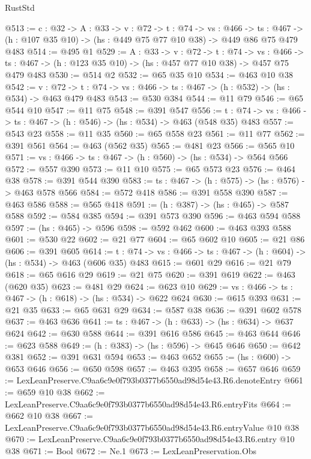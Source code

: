 \begin{lexlean}{RustStd}
\begin{coremodule}
@513 := {c : @32} ->
  {A : @33} ->
  {v : @72} ->
  {t : @74} ->
  {vs : @466} ->
  {ts : @467} -> (h : @107 @35 @10) -> (hs : @449 @75 @77 @10 @38) -> @449 @86 @75 @479 @483
@514 := @495 @1
@529 := {A : @33} ->
  {v : @72} ->
  {t : @74} ->
  {vs : @466} -> {ts : @467} -> (h : @123 @35 @10) -> (hs : @457 @77 @10 @38) -> @457 @75 @479 @483
@530 := @514 @2
@532 := @65 @35 @10
@534 := @463 @10 @38
@542 := {v : @72} ->
  {t : @74} -> {vs : @466} -> {ts : @467} -> (h : @532) -> (hs : @534) -> @463 @479 @483
@543 := @530 @384
@544 := @11 @79
@546 := @65 @544 @10
@547 := @11 @75
@548 := @391 @547
@556 := {t : @74} -> {vs : @466} -> {ts : @467} -> (h : @546) -> (hs : @534) -> @463 (@548 @35) @483
@557 := @543 @23
@558 := @11 @35
@560 := @65 @558 @23
@561 := @11 @77
@562 := @391 @561
@564 := @463 (@562 @35)
@565 := @481 @23
@566 := @565 @10
@571 := {vs : @466} -> {ts : @467} -> (h : @560) -> (hs : @534) -> @564 @566
@572 := @557 @390
@573 := @11 @10
@575 := @65 @573 @23
@576 := @464 @38
@578 := @391 @544 @390
@583 := {ts : @467} -> (h : @575) -> (hs : @576) -> @463 @578 @566
@584 := @572 @418
@586 := @391 @558 @390
@587 := @463 @586
@588 := @565 @418
@591 := (h : @387) -> (hs : @465) -> @587 @588
@592 := @584 @385
@594 := @391 @573 @390
@596 := @463 @594 @588
@597 := (hs : @465) -> @596
@598 := @592 @462
@600 := @463 @393 @588
@601 := @530 @22
@602 := @21 @77
@604 := @65 @602 @10
@605 := @21 @86
@606 := @391 @605
@614 := {t : @74} -> {vs : @466} -> {ts : @467} -> (h : @604) -> (hs : @534) -> @463 (@606 @35) @483
@615 := @601 @29
@616 := @21 @79
@618 := @65 @616 @29
@619 := @21 @75
@620 := @391 @619
@622 := @463 (@620 @35)
@623 := @481 @29
@624 := @623 @10
@629 := {vs : @466} -> {ts : @467} -> (h : @618) -> (hs : @534) -> @622 @624
@630 := @615 @393
@631 := @21 @35
@633 := @65 @631 @29
@634 := @587 @38
@636 := @391 @602 @578
@637 := @463 @636
@641 := {ts : @467} -> (h : @633) -> (hs : @634) -> @637 @624
@642 := @630 @588
@644 := @391 @616 @586
@645 := @463 @644
@646 := @623 @588
@649 := (h : @383) -> (hs : @596) -> @645 @646
@650 := @642 @381
@652 := @391 @631 @594
@653 := @463 @652
@655 := (hs : @600) -> @653 @646
@656 := @650 @598
@657 := @463 @395
@658 := @657 @646
@659 := LexLeanPreserve.C9aa6c9e0f793b0377b6550ad98d54e43.R6.denoteEntry
@661 := @659 @10 @38
@662 := LexLeanPreserve.C9aa6c9e0f793b0377b6550ad98d54e43.R6.entryFits
@664 := @662 @10 @38
@667 := LexLeanPreserve.C9aa6c9e0f793b0377b6550ad98d54e43.R6.entryValue @10 @38
@670 := LexLeanPreserve.C9aa6c9e0f793b0377b6550ad98d54e43.R6.entry @10 @38
@671 := Bool
@672 := Ne.{1}
@673 := LexLeanPreservation.Obs

\end{coremodule}
\end{lexlean}

